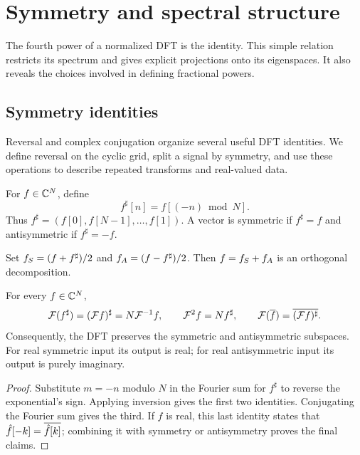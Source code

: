 \section{Symmetry and spectral structure}
\label{sect1-symetrie-tfd}
The fourth power of a normalized DFT is the identity. This simple relation
restricts its spectrum and gives explicit projections onto its eigenspaces.
It also reveals the choices involved in defining fractional powers.

\subsection{Symmetry identities}
\label{sect2-prop-symmetry}

Reversal and complex conjugation organize several useful DFT identities. We
define reversal on the cyclic grid, split a signal by symmetry, and use
these operations to describe repeated transforms and real-valued data.

\begin{defn}
\label{defn-symmetry-operator}\label{notation-48}
For $f\in\mathbb{C}^N$, define
\begin{equation}
\label{eq-defn-symmetrical-sample}
 f^\sharp[n]=f[(-n)\bmod N].
\end{equation}
Thus $f^\sharp=(f[0],f[N-1],\ldots,f[1])$.
A vector is symmetric if $f^\sharp=f$ and antisymmetric if $f^\sharp=-f$.
\end{defn}


\begin{defn}
\label{defn-parts-sym-anti-sym}\label{notation-49}
Set ${f}_S=(f+f^\sharp)/2$ and ${f}_A=(f-f^\sharp)/2$.
Then $f={f}_S+{f}_A$ is an orthogonal decomposition.
\end{defn}


\begin{prop}
For every $f\in\mathbb{C}^N$,
\[
 \mathcal{F}(f^\sharp)=(\mathcal{F} f)^\sharp=N\mathcal{F}^{-1}f,
 \qquad \mathcal{F}^2f=Nf^\sharp,
 \qquad \mathcal{F}(\overline{f})=\overline{(\mathcal{F} f)^\sharp}.
\]
Consequently, the DFT preserves the symmetric and antisymmetric subspaces.
For real symmetric input its output is real; for real antisymmetric input
its output is purely imaginary.
\end{prop}
\begin{proof}
Substitute $m=-n$ modulo $N$ in the Fourier sum for $f^\sharp$ to reverse
the exponential's sign. Applying inversion gives the first two identities.
Conjugating the Fourier sum gives the third. If $f$ is real, this last
identity states that $\hat{f}[-k]=\overline{\hat{f}[k]}$; combining it with symmetry
or antisymmetry proves the final claims.
\end{proof}


